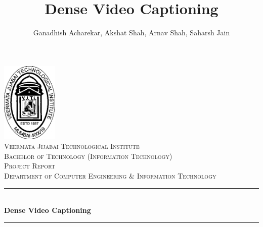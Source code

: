 \documentclass[]{book}
\title{Dense Video Captioning}
\author{Ganadhish Acharekar, Akshat Shah, Arnav Shah, Saharsh Jain}
\begin{document}

\begin{titlepage} %
	\newcommand{\HRule}{\rule{\linewidth}{0.5mm}} %
	
	\center %
	

	\includegraphics[width=0.2\textwidth]{assets/img/vjti.png}\\[1cm] %

	\textsc{\LARGE Veermata Jijabai Technological Institute}\\[1.5cm] %
	
	\textsc{\Large Bachelor of Technology (Information Technology)}\\[0.5cm] %
	
	\textsc{\Large Project Report}\\[0.5cm] %
	
	\textsc{\large Department of Computer Engineering \& Information Technology}\\[0.5cm] %
	
	
	\HRule\\[0.4cm]
	
	{\huge\bfseries Dense Video Captioning}\\[0.4cm] %
	
	\HRule\\[1.5cm]
	

\end{titlepage}
\end{document}
